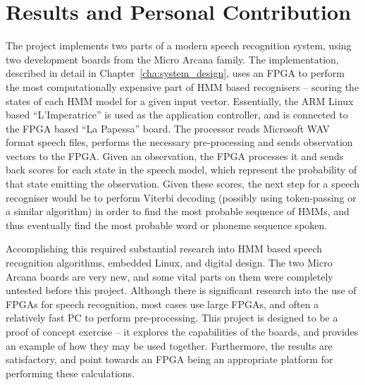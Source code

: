 \section{Results and Personal Contribution} %
\label{sec:contributions}
	The project implements two parts of a modern speech recognition system, using two development boards from the Micro Arcana family.  The implementation, described in detail in Chapter~\ref{cha:system_design}, uses an FPGA to perform the most computationally expensive part of HMM based recognisers -- scoring the states of each HMM model for a given input vector.  Essentially, the ARM Linux based ``L'Imperatrice'' is used as the application controller, and is connected to the FPGA based ``La Papessa'' board.  The processor reads Microsoft WAV format speech files, performs the necessary pre-processing and sends observation vectors to the FPGA.  Given an observation, the FPGA processes it and sends back scores for each state in the speech model, which represent the probability of that state emitting the observation.  Given these scores, the next step for a speech recogniser would be to perform Viterbi decoding (possibly using token-passing or a similar algorithm) in order to find the most probable sequence of HMMs, and thus eventually find the most probable word or phoneme sequence spoken.

	Accomplishing this required substantial research into HMM based speech recognition algorithms, embedded Linux, and digital design.  The two Micro Arcana boards are very new, and some vital parts on them were completely untested before this project.  Although there is significant research into the use of FPGAs for speech recognition, most cases use large FPGAs, and often a relatively fast PC to perform pre-processing.  This project is designed to be a proof of concept exercise -- it explores the capabilities of the boards, and provides an example of how they may be used together.  Furthermore, the results are satisfactory, and point towards an FPGA being an appropriate platform for performing these calculations.


